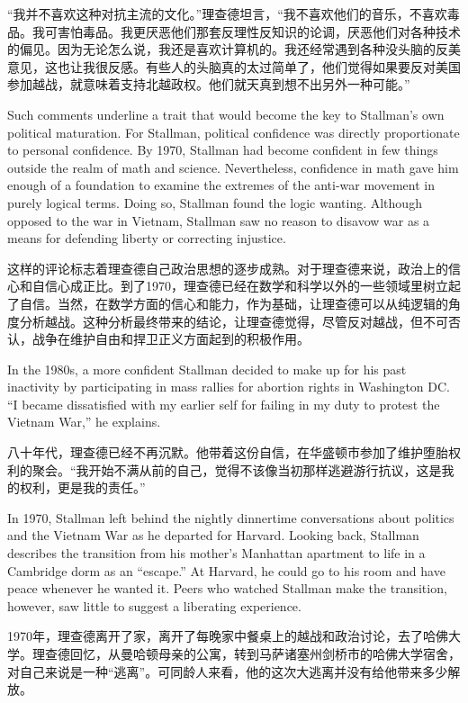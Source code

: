 \ifdefined\chs
``我并不喜欢这种对抗主流的文化。''理查德坦言，``我不喜欢他们的音乐，不喜欢毒品。我可害怕毒品。我更厌恶他们那套反理性反知识的论调，厌恶他们对各种技术的偏见。因为无论怎么说，我还是喜欢计算机的。我还经常遇到各种没头脑的反美意见，这也让我很反感。有些人的头脑真的太过简单了，他们觉得如果要反对美国参加越战，就意味着支持北越政权。他们就天真到想不出另外一种可能。''
\fi

\ifdefined\eng
Such comments underline a trait that would become the key to Stallman's own political maturation. For Stallman, political confidence was directly proportionate to personal confidence. By 1970, Stallman had become confident in few things outside the realm of math and science. Nevertheless, confidence in math gave him enough of a foundation to examine the extremes of the anti-war movement in purely logical terms.  Doing so, Stallman found the logic wanting. Although opposed to the war in Vietnam, Stallman saw no reason to disavow war as a means for defending liberty or correcting injustice.
\fi

\ifdefined\chs
这样的评论标志着理查德自己政治思想的逐步成熟。对于理查德来说，政治上的信心和自信心成正比。到了1970，理查德已经在数学和科学以外的一些领域里树立起了自信。当然，在数学方面的信心和能力，作为基础，让理查德可以从纯逻辑的角度分析越战。这种分析最终带来的结论，让理查德觉得，尽管反对越战，但不可否认，战争在维护自由和捍卫正义方面起到的积极作用。
\fi

\ifdefined\eng
In the 1980s, a more confident Stallman decided to make up for his past inactivity by participating in mass rallies for abortion rights in Washington DC.  ``I became dissatisfied with my earlier self for failing in my duty to protest the Vietnam War,'' he explains.
\fi

\ifdefined\chs
八十年代，理查德已经不再沉默。他带着这份自信，在华盛顿市参加了维护堕胎权利的聚会。``我开始不满从前的自己，觉得不该像当初那样逃避游行抗议，这是我的权利，更是我的责任。''
\fi

\ifdefined\eng
In 1970, Stallman left behind the nightly dinnertime conversations about politics and the Vietnam War as he departed for Harvard. Looking back, Stallman describes the transition from his mother's Manhattan apartment to life in a Cambridge dorm as an ``escape.'' At Harvard, he could go to his room and have peace whenever he wanted it. Peers who watched Stallman make the transition, however, saw little to suggest a liberating experience.
\fi

\ifdefined\chs
1970年，理查德离开了家，离开了每晚家中餐桌上的越战和政治讨论，去了哈佛大学。理查德回忆，从曼哈顿母亲的公寓，转到马萨诸塞州剑桥市的哈佛大学宿舍，对自己来说是一种``逃离''。可同龄人来看，他的这次大逃离并没有给他带来多少解放。
\fi

